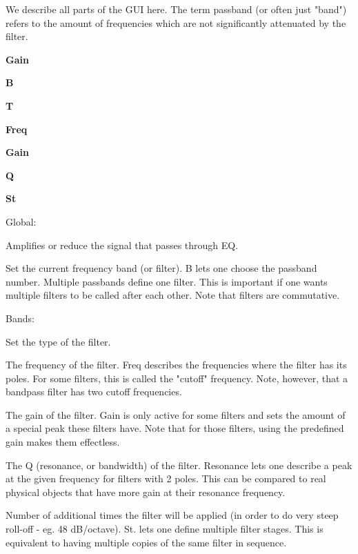    We describe all parts of the GUI here. The term passband (or often just
   "band") refers to the amount of frequencies which are not
   significantly attenuated by the filter.

   \begin{enumber}
      \item \textbf{Gain}
      \item \textbf{B}
      \item \textbf{T}
      \item \textbf{Freq}
      \item \textbf{Gain}
      \item \textbf{Q}
      \item \textbf{St}
   \end{enumber}

Global:

   \setcounter{ItemCounter}{0}      %

   Amplifies or reduce the signal that passes through EQ.

   Set the current frequency band (or filter).
   B lets one choose the passband number. Multiple passbands define one
   filter. This is important if one wants multiple filters to be called
   after each other. Note that filters are commutative.

Bands:

   Set the type of the filter.

   The frequency of the filter.
   Freq describes the frequencies where the filter has its poles. For some
   filters, this is called the "cutoff" frequency. Note, however, that a
   bandpass filter has two cutoff frequencies.

   The gain of the filter.
   Gain is only active for some filters and sets the amount of a special
   peak these filters have. Note that for those filters, using the
   predefined gain makes them effectless.

   The Q (resonance, or bandwidth) of the filter.
   Resonance lets one describe a peak at the given frequency for filters
   with 2 poles. This can be compared to real physical objects that have
   more gain at their resonance frequency.

   Number of additional times the filter will be applied (in
   order to do very steep roll-off - eg. 48 dB/octave).
   St. lets one define multiple filter stages. This is equivalent to
   having multiple copies of the same filter in sequence.

